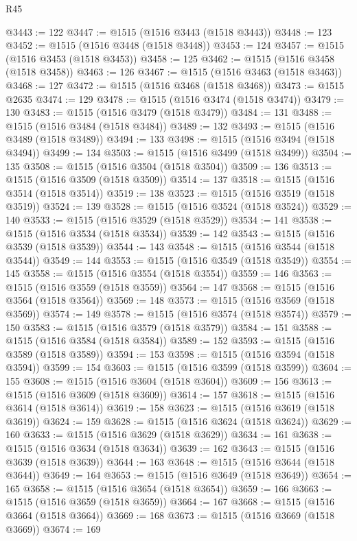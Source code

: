 \begin{lexlean}{R45}
\begin{coremodule}
{@3443 := 122
@3447 := @1515 (@1516 @3443 (@1518 @3443))
@3448 := 123
@3452 := @1515 (@1516 @3448 (@1518 @3448))
@3453 := 124
@3457 := @1515 (@1516 @3453 (@1518 @3453))
@3458 := 125
@3462 := @1515 (@1516 @3458 (@1518 @3458))
@3463 := 126
@3467 := @1515 (@1516 @3463 (@1518 @3463))
@3468 := 127
@3472 := @1515 (@1516 @3468 (@1518 @3468))
@3473 := @1515 @2635
@3474 := 129
@3478 := @1515 (@1516 @3474 (@1518 @3474))
@3479 := 130
@3483 := @1515 (@1516 @3479 (@1518 @3479))
@3484 := 131
@3488 := @1515 (@1516 @3484 (@1518 @3484))
@3489 := 132
@3493 := @1515 (@1516 @3489 (@1518 @3489))
@3494 := 133
@3498 := @1515 (@1516 @3494 (@1518 @3494))
@3499 := 134
@3503 := @1515 (@1516 @3499 (@1518 @3499))
@3504 := 135
@3508 := @1515 (@1516 @3504 (@1518 @3504))
@3509 := 136
@3513 := @1515 (@1516 @3509 (@1518 @3509))
@3514 := 137
@3518 := @1515 (@1516 @3514 (@1518 @3514))
@3519 := 138
@3523 := @1515 (@1516 @3519 (@1518 @3519))
@3524 := 139
@3528 := @1515 (@1516 @3524 (@1518 @3524))
@3529 := 140
@3533 := @1515 (@1516 @3529 (@1518 @3529))
@3534 := 141
@3538 := @1515 (@1516 @3534 (@1518 @3534))
@3539 := 142
@3543 := @1515 (@1516 @3539 (@1518 @3539))
@3544 := 143
@3548 := @1515 (@1516 @3544 (@1518 @3544))
@3549 := 144
@3553 := @1515 (@1516 @3549 (@1518 @3549))
@3554 := 145
@3558 := @1515 (@1516 @3554 (@1518 @3554))
@3559 := 146
@3563 := @1515 (@1516 @3559 (@1518 @3559))
@3564 := 147
@3568 := @1515 (@1516 @3564 (@1518 @3564))
@3569 := 148
@3573 := @1515 (@1516 @3569 (@1518 @3569))
@3574 := 149
@3578 := @1515 (@1516 @3574 (@1518 @3574))
@3579 := 150
@3583 := @1515 (@1516 @3579 (@1518 @3579))
@3584 := 151
@3588 := @1515 (@1516 @3584 (@1518 @3584))
@3589 := 152
@3593 := @1515 (@1516 @3589 (@1518 @3589))
@3594 := 153
@3598 := @1515 (@1516 @3594 (@1518 @3594))
@3599 := 154
@3603 := @1515 (@1516 @3599 (@1518 @3599))
@3604 := 155
@3608 := @1515 (@1516 @3604 (@1518 @3604))
@3609 := 156
@3613 := @1515 (@1516 @3609 (@1518 @3609))
@3614 := 157
@3618 := @1515 (@1516 @3614 (@1518 @3614))
@3619 := 158
@3623 := @1515 (@1516 @3619 (@1518 @3619))
@3624 := 159
@3628 := @1515 (@1516 @3624 (@1518 @3624))
@3629 := 160
@3633 := @1515 (@1516 @3629 (@1518 @3629))
@3634 := 161
@3638 := @1515 (@1516 @3634 (@1518 @3634))
@3639 := 162
@3643 := @1515 (@1516 @3639 (@1518 @3639))
@3644 := 163
@3648 := @1515 (@1516 @3644 (@1518 @3644))
@3649 := 164
@3653 := @1515 (@1516 @3649 (@1518 @3649))
@3654 := 165
@3658 := @1515 (@1516 @3654 (@1518 @3654))
@3659 := 166
@3663 := @1515 (@1516 @3659 (@1518 @3659))
@3664 := 167
@3668 := @1515 (@1516 @3664 (@1518 @3664))
@3669 := 168
@3673 := @1515 (@1516 @3669 (@1518 @3669))
@3674 := 169
}
\end{coremodule}
\end{lexlean}
